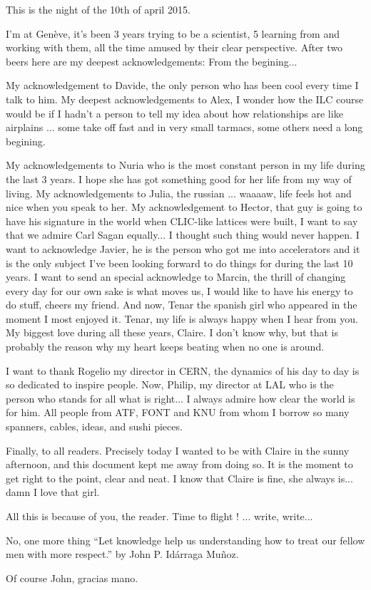 \vfill
This is the night of the 10th of april 2015.\par
I'm at Gen\`eve, %
it's been 3 years trying to be a scientist, 5 learning from and working with them, all the time amused by their clear perspective. After two beers here are my deepest acknowledgements: From the begining...\par
My acknowledgement to Davide, the only person who has been cool every time I talk to him. My deepest acknowledgements to Alex, I wonder how the ILC course would be if I hadn't a person to tell my idea about how relationships are like airplains ... some take off fast and in very small tarmacs, some others need a long begining.\par
My acknowledgements to Nuria who is the most constant person in my life during the last 3 years. I hope she has got something good for her life from my way of living. My acknowledgements to Julia, the russian ... waaaaw, life feels hot and nice when you speak to her. My acknowledgement to Hector, that guy is going to have his signature in the world when CLIC-like lattices were built, I want to say that we admire Carl Sagan equally... I thought such thing would never happen. I want to acknowledge Javier, he is the person who got me into accelerators and it is the only subject I've been looking forward to do things for during the last 10 years. I want to send an special acknowledge to Marcin, the thrill of changing every day for our own sake is what moves us, I would like to have his energy to do stuff, cheers my friend. And now, Tenar the spanish girl who appeared in the moment I most enjoyed it. Tenar, my life is always happy when I hear from you. My biggest love during all these years, Claire. I don't 
know why, but that is probably the reason why my heart keeps beating when no one is around.\par
I want to thank Rogelio my director in CERN, the dynamics of his day to day is so dedicated to inspire people. Now, Philip, my director at LAL who is the person who stands for all what is right... I always admire how clear the world is for him. All people from ATF, FONT and KNU from whom I borrow so many spanners, cables, ideas, and sushi pieces.\par
Finally, to all readers. Precisely today I wanted to be with Claire in the sunny afternoon, and this document kept me away from doing so. It is the moment to get right to the point, clear and neat. I know that Claire is fine, she always is... damn I love that girl.\par
All this is because of you, the reader. Time to flight ! ... write, write...\par
No, one more thing ``Let knowledge help us understanding how to treat our fellow men with more respect.'' by John P. Id\'arraga Mu\~noz.\par
Of course John, gracias mano.
\vfill
